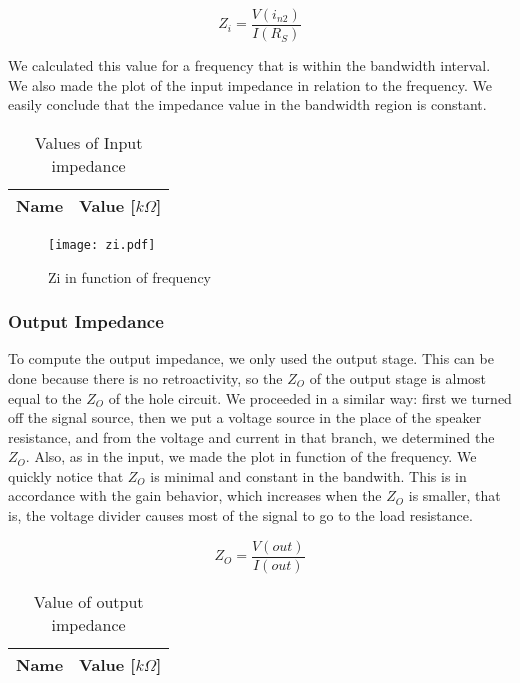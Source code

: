 \begin{equation}
    Z_i = \frac{V(i_{n2})}{I(R_S)}
\end{equation}

We calculated this value for a frequency that is within the bandwidth interval. We also made the plot of the input impedance in relation to the frequency. We easily conclude that the impedance value in the bandwidth region is constant.


\vspace{0.1in}
\begin{table}[ht]
  \centering
  \begin{tabular}{|l|r|}
    \hline    
    {\bf Name} & {\bf Value [$k\Omega$]} \\ \hline
    
  \end{tabular}
  \caption{Values of Input impedance}
  \label{tab:r2}
\end{table}
\vspace{0.3in}

\vspace{-0.9in}
\begin{figure}[H] \centering
\texttt{[image: zi.pdf]}
\caption{Zi in function of frequency}
\label{fig:dev122}
\end{figure}

\subsubsection{Output Impedance}


To compute the output impedance, we only used the output stage. This can be done because there is no retroactivity, so the $Z_O$ of the output stage is almost equal to the $Z_O$ of the hole circuit. We proceeded in a similar way: first we turned off the signal source, then we put a voltage source in the place of the speaker resistance, and from the voltage and current in that branch, we determined the $Z_O$. Also, as in the input, we made the plot in function of the frequency. We quickly notice that $Z_O$ is minimal and constant in the bandwith. This is in accordance with the gain behavior, which increases when the $Z_O$ is smaller, that is, the voltage divider causes most of the signal to go to the load resistance.


\begin{equation}
    Z_O = \frac{V(out)}{I(out)}
\end{equation}


\vspace{0.1in}
\begin{table}[ht]
  \centering
  \begin{tabular}{|l|r|}
    \hline    
    {\bf Name} & {\bf Value [$k\Omega$]} \\ \hline
    
  \end{tabular}
  \caption{Value of output impedance}
  \label{tab:r3}
\end{table}
\vspace{0.3in}


